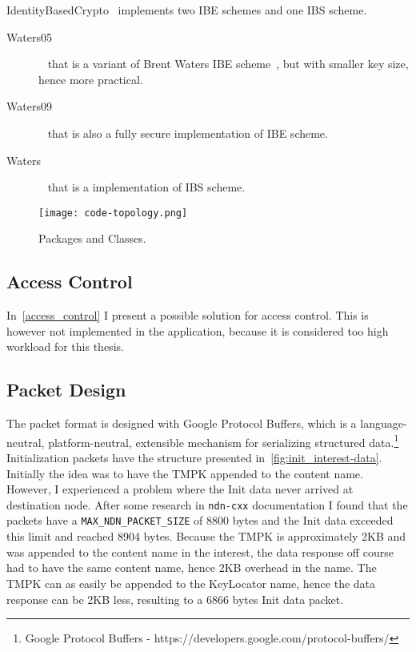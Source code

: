 IdentityBasedCrypto~\cite[identityBasedCrypto.py]{garseg15} implements two \gls{IBE} schemes and one \gls{IBS} scheme. 
\begin{description}
  \item[Waters05]~\cite{DBLP:journals/iacr/Naccache05} that is a variant of Brent Waters \gls{IBE} scheme~\cite{DBLP:journals/iacr/Waters04}, but with smaller key size, hence more practical.
  \item[Waters09]~\cite{DBLP:conf/crypto/Waters09} that is also a fully secure implementation of \gls{IBE} scheme.
  \item[Waters]~\cite{DBLP:journals/iacr/Waters04} that is a implementation of \gls{IBS} scheme.
\end{description}

\begin{figure}[ht]
  \centering
  \texttt{[image: code-topology.png]}
  \caption{Packages and Classes.}
  \label{fig:code-topology}
\end{figure}

\subsection{Access Control}
In~\autoref{access_control} I present a possible solution for access control.
This is however not implemented in the application, because it is considered too high workload for this thesis.

\subsection{Packet Design}
The packet format is designed with Google Protocol Buffers, which is a language-neutral, platform-neutral, extensible mechanism for serializing structured \gls{data}.\footnote{Google Protocol Buffers - https://developers.google.com/protocol-buffers/}
Initialization packets have the structure presented in~\autoref{fig:init_interest-data}.
Initially the idea was to have the \gls{TMPK} appended to the content \gls{name}. 
However, I experienced a problem where the Init \gls{data} never arrived at destination node. 
After some research in \texttt{ndn-cxx} documentation I found that the packets have a \texttt{MAX\_NDN\_PACKET\_SIZE} of 8800 bytes and the Init \gls{data} exceeded this limit and reached 8904 bytes.
Because the \gls{TMPK} is approximately 2\gls{KB} and was appended to the content \gls{name} in the \gls{interest}, the \gls{data} response off course had to have the same content \gls{name}, hence 2\gls{KB} overhead in the \gls{name}. 
The \gls{TMPK} can as easily be appended to the KeyLocator \gls{name}, hence the \gls{data} response can be 2\gls{KB} less, resulting to a 6866 bytes Init \gls{data} packet.

